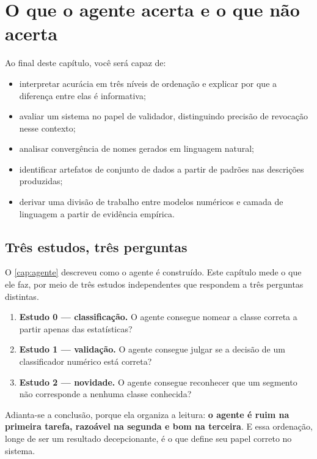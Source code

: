 \chapter{O que o agente acerta e o que não acerta}
\label{cap:resultados-agente}

\begin{objetivos}
Ao final deste capítulo, você será capaz de:
\begin{itemize}[leftmargin=*,itemsep=0.2em]
  \item interpretar acurácia em três níveis de ordenação e explicar por que a diferença
        entre elas é informativa;
  \item avaliar um sistema no papel de validador, distinguindo precisão de revocação
        nesse contexto;
  \item analisar convergência de nomes gerados em linguagem natural;
  \item identificar artefatos de conjunto de dados a partir de padrões nas descrições
        produzidas;
  \item derivar uma divisão de trabalho entre modelos numéricos e camada de linguagem a
        partir de evidência empírica.
\end{itemize}
\end{objetivos}

\section{Três estudos, três perguntas}

O \cref{cap:agente} descreveu como o agente é construído. Este capítulo mede o que ele
faz, por meio de três estudos independentes que respondem a três perguntas distintas.

\begin{enumerate}[leftmargin=*,itemsep=0.3em]
  \item \textbf{Estudo 0 --- classificação.} O agente consegue nomear a classe correta a
        partir apenas das estatísticas?
  \item \textbf{Estudo 1 --- validação.} O agente consegue julgar se a decisão de um
        classificador numérico está correta?
  \item \textbf{Estudo 2 --- novidade.} O agente consegue reconhecer que um segmento não
        corresponde a nenhuma classe conhecida?
\end{enumerate}

Adianta-se a conclusão, porque ela organiza a leitura: \textbf{o agente é ruim na
primeira tarefa, razoável na segunda e bom na terceira}. E essa ordenação, longe de ser
um resultado decepcionante, é o que define seu papel correto no sistema.

